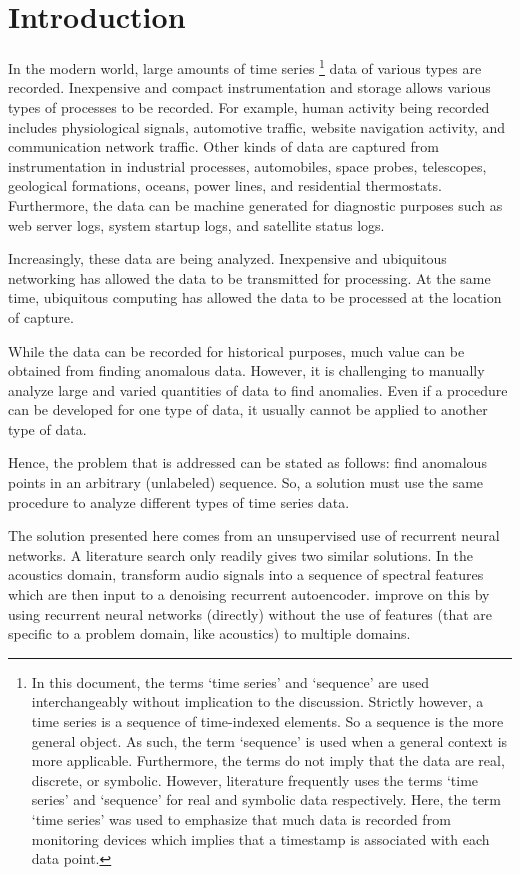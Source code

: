 \chapter{Introduction}
\label{ch:intro}

In the modern world, large amounts of time series%
\footnote{
In this document, the terms `time series' and `sequence' are used interchangeably without implication to the discussion.
%
Strictly however, a time series is a sequence of time-indexed elements.
%
So a sequence is the more general object.
%
As such, the term `sequence' is used when a general context is more applicable.
%
Furthermore, the terms do not imply that the data are real, discrete, or symbolic.
%
However, literature frequently uses the terms `time series' and `sequence' for real and symbolic data respectively.
%
Here, the term `time series' was used to emphasize that much data is recorded from monitoring devices which implies that a timestamp is associated with each data point.}
data of various types are recorded.  Inexpensive and compact instrumentation and storage allows various types of processes to be recorded. For example, human activity being recorded includes physiological signals, automotive traffic, website navigation activity, and communication network traffic. Other kinds of data are captured from instrumentation in industrial processes, automobiles, space probes, telescopes, geological formations, oceans, power lines, and residential thermostats. Furthermore, the data can be machine generated for diagnostic purposes such as web server logs, system startup logs, and satellite status logs.

Increasingly, these data are being analyzed. Inexpensive and ubiquitous networking has allowed the data to be transmitted for processing. At the same time, ubiquitous computing has allowed the data to be processed at the location of capture.

While the data can be recorded for historical purposes, much value can be obtained from finding anomalous data. However, it is challenging to manually analyze large and varied quantities of data to find anomalies. Even if a procedure can be developed for one type of data, it usually cannot be applied to another type of data.

Hence, the problem that is addressed can be stated as follows: find anomalous points in an arbitrary (unlabeled) sequence. So, a solution must use the same procedure to analyze different types of time series data.

The solution presented here comes from an unsupervised use of recurrent neural networks. A literature search only readily gives two similar solutions. In the acoustics domain, \cite{Marchi2015} transform audio signals into a sequence of spectral features which are then input to a denoising recurrent autoencoder. \cite{Malhotra2015} improve on this by using recurrent neural networks (directly) without the use of features (that are specific to a problem domain, like acoustics) to multiple domains.

